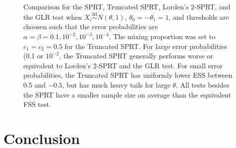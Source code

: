 \documentclass[11pt]{article}
\begin{document}
\begin{figure}[hp]
\caption{Comparison for the SPRT, Truncated SPRT, Lorden's 2-SPRT, and the GLR test when $X_i \overset{\text{iid}}\sim N(\theta, 1)$, $\theta_0 = -\theta_1 = 1$, and thresholds are choosen such that the error probabilities are $\alpha = \beta = 0.1, 10^{-2}, 10^{-3}, 10^{-4}$. The mixing proportion was set to $c_1 = c_2 = 0.5$ for the Truncated SPRT. For large error probabilities (0.1 or $10^{-2}$, the Truncated SPRT generally performs worse or equivalent to Lorden's 2-SPRT and the GLR test. For small error probabilities, the Truncated SPRT has uniformly lower ESS between 0.5 and $-0.5$, but has much heavy tails for large $\theta$. All tests besides the SPRT have a smaller sample size on average than the equivalent FSS test.}
\end{figure}

\section{Conclusion}

\newpage


\end{document}
